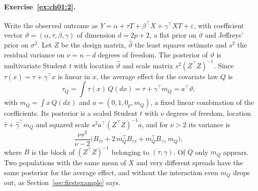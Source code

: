 \paragraph{Exercise~\ref{ex:ch01:2}.} Write the observed outcome as $Y = \alpha + \tau T + \beta^\top X + \gamma^\top X T + \varepsilon$, with coefficient vector $\vartheta = (\alpha, \tau, \beta, \gamma)$ of dimension $d = 2p + 2$, a flat prior on $\vartheta$ and Jeffreys' prior on $\sigma^2$. Let $Z$ be the design matrix, $\hat\vartheta$ the least squares estimate and $s^2$ the residual variance on $\nu = n - d$ degrees of freedom. The posterior of $\vartheta$ is multivariate Student $t$ with location $\hat\vartheta$ and scale matrix $s^2(Z^\top Z)^{-1}$. Since $\tau(x) = \tau + \gamma^\top x$ is linear in $x$, the average effect for the covariate law $Q$ is
\[
\tau_Q = \int \tau(x)\,Q(dx) = \tau + \gamma^\top m_Q = a^\top\vartheta,
\]
with $m_Q = \int x\,Q(dx)$ and $a = (0, 1, 0_p, m_Q)$, a fixed linear combination of the coefficients. Its posterior is a scaled Student $t$ with $\nu$ degrees of freedom, location $\hat\tau + \hat\gamma^\top m_Q$ and squared scale $s^2 a^\top (Z^\top Z)^{-1} a$, and for $\nu > 2$ its variance is
\[
\frac{\nu s^2}{\nu - 2}\bigl(B_{\tau\tau} + 2\,m_Q^\top B_{\gamma\tau} + m_Q^\top B_{\gamma\gamma}\,m_Q\bigr),
\]
where $B$ is the block of $(Z^\top Z)^{-1}$ belonging to $(\tau, \gamma)$. Of $Q$ only $m_Q$ appears. Two populations with the same mean of $X$ and very different spreads have the same posterior for the average effect, and without the interaction even $m_Q$ drops out, as Section~\ref{sec:firstexample} says.


